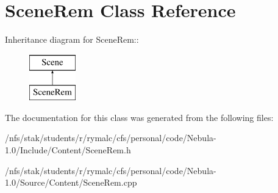 \hypertarget{classSceneRem}{
\section{SceneRem Class Reference}
\label{classSceneRem}
}
Inheritance diagram for SceneRem::\begin{figure}[H]
\begin{center}
\leavevmode
\includegraphics[height=2cm]{classSceneRem}
\end{center}
\end{figure}


The documentation for this class was generated from the following files:\begin{DoxyCompactItemize}
\item 
/nfs/stak/students/r/rymalc/cfs/personal/code/Nebula-\/1.0/Include/Content/SceneRem.h\item 
/nfs/stak/students/r/rymalc/cfs/personal/code/Nebula-\/1.0/Source/Content/SceneRem.cpp\end{DoxyCompactItemize}
